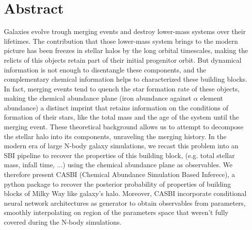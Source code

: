 \chapter{Abstract}
Galaxies evolve trough merging events and destroy lower-mass systems over their lifetimes. The contribution that those lower-mass system brings to 
the modern picture has been freezes in stellar halos by the long orbital timescales, making the relicts of this objects retain part of 
their initial progenitor orbit. But dynamical information is not enough to disentangle these components, and the complementary chemical information 
helps to characterized these building blocks. In fact, merging events tend to quench the star formation rate of these objects, making the chemical 
abundance plane (iron abundance against $\alpha$ element abundance) a distinct imprint that retains information on the conditions of formation of their stars, like the total mass and 
the age of the system until the merging event. These theoretical background allows us to attempt to decompose the stellar halo into its components, 
unraveling the merging history. In the modern era of large N-body galaxy simulations, we recast this problem into an SBI pipeline to recover the 
properties of this building block, (e.g. total stellar mass, infall time, ...) using the chemical abundance plane as observables. We therefore present CASBI 
(Chemical Abundance Simulation Based Inferece), a python package to recover the posterior probability of properties of building blocks of Milky Way 
like galaxy's halo. Moreover, CASBI incorporate conditional neural network architectures as generator to obtain observables from parameters, smoothly interpolating on region of the parameters space that weren't fully covered during the N-body simulations.


\newcommand{\vect}[1]{\boldsymbol{#1}}
\usetikzlibrary{positioning, quotes}
\usetikzlibrary{pgfplots.colorbrewer}

\pgfplotsset{colormap/PuBuGn}
\pgfplotsset{colormap/PuRd}


